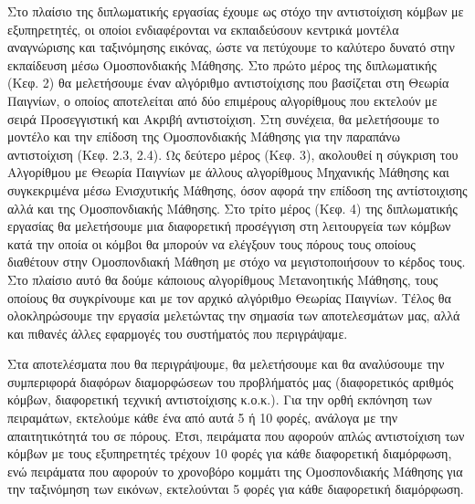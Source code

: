 Στο πλαίσιο της διπλωματικής εργασίας έχουμε ως στόχο την αντιστοίχιση κόμβων με εξυπηρετητές, οι οποίοι ενδιαφέρονται να εκπαιδεύσουν κεντρικά μοντέλα αναγνώρισης και ταξινόμησης εικόνας, ώστε να πετύχουμε το καλύτερο δυνατό στην εκπαίδευση μέσω Ομοσπονδιακής Μάθησης. Στο πρώτο μέρος της διπλωματικής (Κεφ. 2) θα μελετήσουμε έναν αλγόριθμο αντιστοίχισης που βασίζεται στη Θεωρία Παιγνίων, ο οποίος αποτελείται από δύο επιμέρους αλγορίθμους που εκτελούν με σειρά Προσεγγιστική και Ακριβή αντιστοίχιση. Στη συνέχεια, θα μελετήσουμε το μοντέλο και την επίδοση της Ομοσπονδιακής Μάθησης για την παραπάνω αντιστοίχιση (Κεφ. 2.3, 2.4). Ως δεύτερο μέρος (Κεφ. 3), ακολουθεί η σύγκριση του Αλγορίθμου με Θεωρία Παιγνίων με άλλους αλγορίθμους Μηχανικής Μάθησης και συγκεκριμένα μέσω Ενισχυτικής Μάθησης, όσον αφορά την επίδοση της αντίστοιχισης αλλά και της Ομοσπονδιακής Μάθησης. Στο τρίτο μέρος (Κεφ. 4) της διπλωματικής εργασίας θα μελετήσουμε μια διαφορετική προσέγγιση στη λειτουργεία των κόμβων κατά την οποία οι κόμβοι θα μπορούν να ελέγξουν τους πόρους τους οποίους διαθέτουν στην Ομοσπονδιακή Μάθηση με στόχο να μεγιστοποιήσουν το κέρδος τους. Στο πλαίσιο αυτό θα δούμε κάποιους αλγορίθμους Μετανοητικής Μάθησης, τους οποίους θα συγκρίνουμε και με τον αρχικό αλγόριθμο Θεωρίας Παιγνίων. Τέλος θα ολοκληρώσουμε την εργασία μελετώντας την σημασία των αποτελεσμάτων μας, αλλά και πιθανές άλλες εφαρμογές του συστήματός που περιγράψαμε.

Στα αποτελέσματα που θα περιγράψουμε, θα μελετήσουμε και θα αναλύσουμε την συμπεριφορά διαφόρων διαμορφώσεων του προβλήματός μας (διαφορετικός αριθμός κόμβων, διαφορετική τεχνική αντιστοίχισης κ.ο.κ.). Για την ορθή εκπόνηση των πειραμάτων, εκτελούμε κάθε ένα από αυτά 5 ή 10 φορές, ανάλογα με την απαιτητικότητά του σε πόρους. Έτσι, πειράματα που αφορούν απλώς αντιστοίχιση των κόμβων με τους εξυπηρετητές τρέχουν 10 φορές για κάθε διαφορετική διαμόρφωση, ενώ πειράματα που αφορούν το χρονοβόρο κομμάτι της Ομοσπονδιακής Μάθησης για την ταξινόμηση των εικόνων, εκτελούνται 5 φορές για κάθε διαφορετική διαμόρφωση.